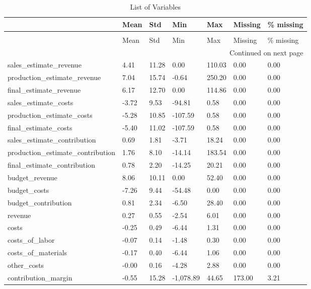 \begin{landscape}\begin{longtable}[h!]{lllllll}
\caption{List of Variables} \label{eda_1} \\
\toprule
 & Mean & Std & Min & Max & Missing & \% missing \\
\midrule
\endfirsthead
\caption[]{List of Variables} \\
\toprule
 & Mean & Std & Min & Max & Missing & \% missing \\
\midrule
\endhead
\midrule
\multicolumn{7}{r}{Continued on next page} \\
\midrule
\endfoot
\bottomrule
\endlastfoot
sales_estimate_revenue & 4.41 & 11.28 & 0.00 & 110.03 & 0.00 & 0.00 \\
production_estimate_revenue & 7.04 & 15.74 & -0.64 & 250.20 & 0.00 & 0.00 \\
final_estimate_revenue & 6.17 & 12.70 & 0.00 & 114.86 & 0.00 & 0.00 \\
sales_estimate_costs & -3.72 & 9.53 & -94.81 & 0.58 & 0.00 & 0.00 \\
production_estimate_costs & -5.28 & 10.85 & -107.59 & 0.58 & 0.00 & 0.00 \\
final_estimate_costs & -5.40 & 11.02 & -107.59 & 0.58 & 0.00 & 0.00 \\
sales_estimate_contribution & 0.69 & 1.81 & -3.71 & 18.24 & 0.00 & 0.00 \\
production_estimate_contribution & 1.76 & 8.10 & -14.14 & 183.54 & 0.00 & 0.00 \\
final_estimate_contribution & 0.78 & 2.20 & -14.25 & 20.21 & 0.00 & 0.00 \\
budget_revenue & 8.06 & 10.11 & 0.00 & 52.40 & 0.00 & 0.00 \\
budget_costs & -7.26 & 9.44 & -54.48 & 0.00 & 0.00 & 0.00 \\
budget_contribution & 0.81 & 2.34 & -6.50 & 28.40 & 0.00 & 0.00 \\
revenue & 0.27 & 0.55 & -2.54 & 6.01 & 0.00 & 0.00 \\
costs & -0.25 & 0.49 & -6.44 & 1.31 & 0.00 & 0.00 \\
costs_of_labor & -0.07 & 0.14 & -1.48 & 0.30 & 0.00 & 0.00 \\
costs_of_materials & -0.17 & 0.40 & -6.44 & 1.06 & 0.00 & 0.00 \\
other_costs & -0.00 & 0.16 & -4.28 & 2.88 & 0.00 & 0.00 \\
contribution_margin & -0.55 & 15.28 & -1,078.89 & 44.65 & 173.00 & 3.21 \\

\end{longtable}
\end{landscape}
